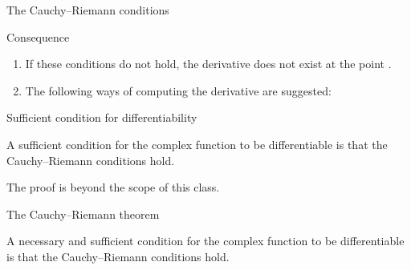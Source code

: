 \begin{EMunit}


\end{EMunit}

\begin{EMimportant}{The Cauchy--Riemann conditions}


\end{EMimportant}

\begin{EMremark}{Consequence}

\begin{enumerate}
\def\labelenumi{\arabic{enumi}.}
\tightlist
\item
  If these conditions do not hold, the derivative does not exist at the point .
\item
  The following ways of computing the derivative are suggested:
\end{enumerate}

\end{EMremark}

\begin{EMtheorem}{Sufficient condition for differentiability}

A sufficient condition for the complex function  to be differentiable is that the Cauchy--Riemann conditions hold.

The proof is beyond the scope of this class.

\end{EMtheorem}

\begin{EMtheorem}{The Cauchy--Riemann theorem}

A necessary and sufficient condition for the complex function  to be differentiable is that the Cauchy--Riemann conditions hold.

\end{EMtheorem}

